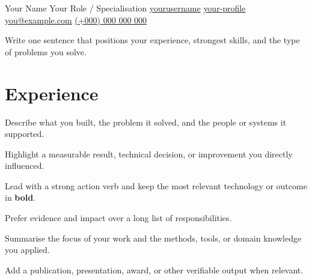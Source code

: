 \documentclass{cv}
\begin{document}
\namesection
{Your}
{Name}
{Your Role / Specialisation}
{
  \contactline
    {\href{https://github.com/yourusername}{yourusername}}
    {\href{https://www.linkedin.com/in/your-profile}{your-profile}}
    {\href{mailto:you@example.com}{you@example.com}}
    {\href{tel:+000000000000}{(+000) 000 000 000}}
}

\headerbar

\vspace{3pt}
\begin{center}
\fontsize{9.5pt}{12pt}\selectfont
Write one sentence that positions your experience, strongest skills, and the type of problems you solve.
\end{center}
\vspace{-2pt}

\begin{minipage}[t]{0.64\textwidth}

\section{Experience}

\begin{tightemize}
  \item Describe what you built, the problem it solved, and the people or systems it supported.
  \item Highlight a measurable result, technical decision, or improvement you directly influenced.
\end{tightemize}

\entrysep

\begin{tightemize}
  \item Lead with a strong action verb and keep the most relevant technology or outcome in \textbf{bold}.
  \item Prefer evidence and impact over a long list of responsibilities.
\end{tightemize}

\entrysep

\begin{tightemize}
  \item Summarise the focus of your work and the methods, tools, or domain knowledge you applied.
  \item Add a publication, presentation, award, or other verifiable output when relevant.
\end{tightemize}


\end{minipage}
\end{document}
